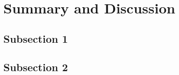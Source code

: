 
\section{Summary and Discussion}
\label{sec:summary_discussion}

\blindtext

\subsection{Subsection 1}
\label{subsec:summary_discussion_1}


\blindtext

\subsection{Subsection 2}
\label{subsec:summary_discussion_2}

\blindtext